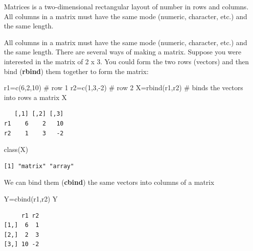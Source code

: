 \documentclass[
  letterpaper,
  DIV=11,
  numbers=noendperiod]{scrreprt}
\newenvironment{Shaded}{\begin{snugshade}}{\end{snugshade}}
\newcommand{\CommentTok}[1]{\textcolor[rgb]{0.37,0.37,0.37}{#1}}
\newcommand{\DecValTok}[1]{\textcolor[rgb]{0.68,0.00,0.00}{#1}}
\newcommand{\FunctionTok}[1]{\textcolor[rgb]{0.28,0.35,0.67}{#1}}
\newcommand{\NormalTok}[1]{\textcolor[rgb]{0.00,0.23,0.31}{#1}}
\newcommand{\OtherTok}[1]{\textcolor[rgb]{0.00,0.23,0.31}{#1}}
\newcommand{\SpecialCharTok}[1]{\textcolor[rgb]{0.37,0.37,0.37}{#1}}
\begin{document}
Matrices is a two-dimensional rectangular layout of number in rows and
columns. All columns in a matrix must have the same mode (numeric,
character, etc.) and the same length.

All columns in a matrix must have the same mode (numeric, character,
etc.) and the same length. There are several ways of making a matrix.
Suppose you were interested in the matrix of 2 x 3. You could form the
two rows (vectors) and then bind (\textbf{rbind}) them together to form
the matrix:

\begin{Shaded}
\begin{Highlighting}[]
\NormalTok{r1}\OtherTok{=}\FunctionTok{c}\NormalTok{(}\DecValTok{6}\NormalTok{,}\DecValTok{2}\NormalTok{,}\DecValTok{10}\NormalTok{)     }\CommentTok{\# row 1}
\NormalTok{r2}\OtherTok{=}\FunctionTok{c}\NormalTok{(}\DecValTok{1}\NormalTok{,}\DecValTok{3}\NormalTok{,}\SpecialCharTok{{-}}\DecValTok{2}\NormalTok{)     }\CommentTok{\# row 2}
\NormalTok{X}\OtherTok{=}\FunctionTok{rbind}\NormalTok{(r1,r2)   }\CommentTok{\# binds the vectors into rows a matrix}
\NormalTok{X}
\end{Highlighting}
\end{Shaded}

\begin{verbatim}
   [,1] [,2] [,3]
r1    6    2   10
r2    1    3   -2
\end{verbatim}

\begin{Shaded}
\begin{Highlighting}[]
\FunctionTok{class}\NormalTok{(X)}
\end{Highlighting}
\end{Shaded}

\begin{verbatim}
[1] "matrix" "array" 
\end{verbatim}

We can bind them (\textbf{cbind}) the same vectors into columns of a
matrix

\begin{Shaded}
\begin{Highlighting}[]
\NormalTok{Y}\OtherTok{=}\FunctionTok{cbind}\NormalTok{(r1,r2)   }
\NormalTok{Y}
\end{Highlighting}
\end{Shaded}

\begin{verbatim}
     r1 r2
[1,]  6  1
[2,]  2  3
[3,] 10 -2
\end{verbatim}
\end{document}
